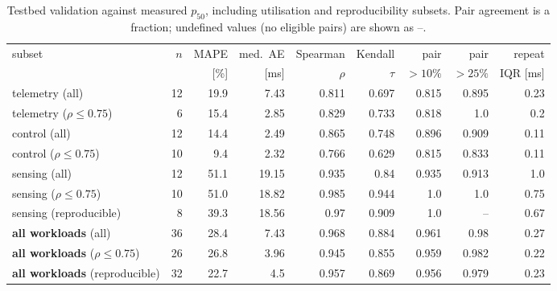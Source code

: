 \documentclass[preprint,11pt,3p]{elsarticle}
\begin{document}
\begin{table}[!htbp]\centering
\caption{Testbed validation against measured $p_{50}$, including utilisation and reproducibility subsets. Pair agreement is a fraction; undefined values (no eligible pairs) are shown as --.}
\scriptsize
\setlength{\tabcolsep}{3pt}
\begin{tabular}{lrrrrrrrr}
\toprule
subset & $n$ & MAPE & med.\ AE & Spearman & Kendall & pair & pair & repeat \\
 & & [\%] & [ms] & $\rho$ & $\tau$ & $>10\%$ & $>25\%$ & IQR [ms] \\
\midrule
telemetry (all) & 12 & 19.9 & 7.43 & 0.811 & 0.697 & 0.815 & 0.895 & 0.23 \\
telemetry ($\rho\le0.75$) & 6 & 15.4 & 2.85 & 0.829 & 0.733 & 0.818 & 1.0 & 0.2 \\
control (all) & 12 & 14.4 & 2.49 & 0.865 & 0.748 & 0.896 & 0.909 & 0.11 \\
control ($\rho\le0.75$) & 10 & 9.4 & 2.32 & 0.766 & 0.629 & 0.815 & 0.833 & 0.11 \\
sensing (all) & 12 & 51.1 & 19.15 & 0.935 & 0.84 & 0.935 & 0.913 & 1.0 \\
sensing ($\rho\le0.75$) & 10 & 51.0 & 18.82 & 0.985 & 0.944 & 1.0 & 1.0 & 0.75 \\
sensing (reproducible) & 8 & 39.3 & 18.56 & 0.97 & 0.909 & 1.0 & -- & 0.67 \\
\textbf{all workloads} (all) & 36 & 28.4 & 7.43 & 0.968 & 0.884 & 0.961 & 0.98 & 0.27 \\
\textbf{all workloads} ($\rho\le0.75$) & 26 & 26.8 & 3.96 & 0.945 & 0.855 & 0.959 & 0.982 & 0.22 \\
\textbf{all workloads} (reproducible) & 32 & 22.7 & 4.5 & 0.957 & 0.869 & 0.956 & 0.979 & 0.23 \\
\bottomrule
\end{tabular}
\end{table}
\clearpage
\end{document}
